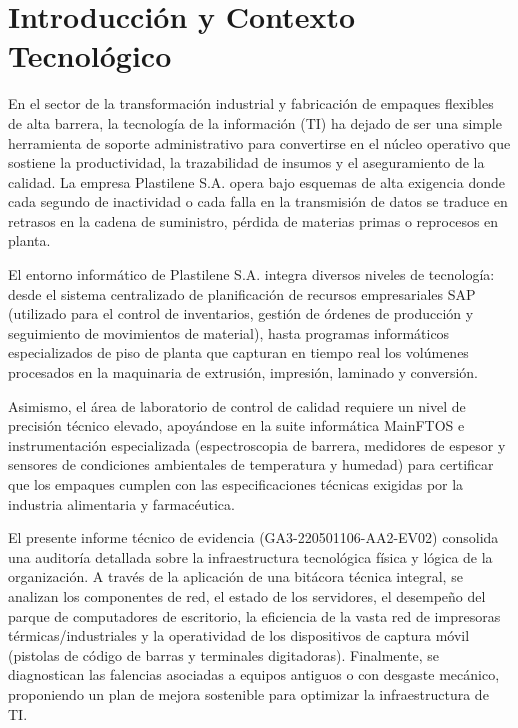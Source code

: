 


	
	
	\newpage
	\tableofcontents
	\newpage
	\doublespacing
	
	\section{Introducción y Contexto Tecnológico}
		En el sector de la transformación industrial y fabricación de empaques flexibles de alta barrera, la tecnología de la información (TI) ha dejado de ser una simple herramienta de soporte administrativo para convertirse en el núcleo operativo que sostiene la productividad, la trazabilidad de insumos y el aseguramiento de la calidad. La empresa Plastilene S.A. opera bajo esquemas de alta exigencia donde cada segundo de inactividad o cada falla en la transmisión de datos se traduce en retrasos en la cadena de suministro, pérdida de materias primas o reprocesos en planta.
		
		El entorno informático de Plastilene S.A. integra diversos niveles de tecnología: desde el sistema centralizado de planificación de recursos empresariales SAP (utilizado para el control de inventarios, gestión de órdenes de producción y seguimiento de movimientos de material), hasta programas informáticos especializados de piso de planta que capturan en tiempo real los volúmenes procesados en la maquinaria de extrusión, impresión, laminado y conversión.
		
		Asimismo, el área de laboratorio de control de calidad requiere un nivel de precisión técnico elevado, apoyándose en la suite informática MainFTOS e instrumentación especializada (espectroscopia de barrera, medidores de espesor y sensores de condiciones ambientales de temperatura y humedad) para certificar que los empaques cumplen con las especificaciones técnicas exigidas por la industria alimentaria y farmacéutica.
		
		El presente informe técnico de evidencia (GA3-220501106-AA2-EV02) consolida una auditoría detallada sobre la infraestructura tecnológica física y lógica de la organización. A través de la aplicación de una bitácora técnica integral, se analizan los componentes de red, el estado de los servidores, el desempeño del parque de computadores de escritorio, la eficiencia de la vasta red de impresoras térmicas/industriales y la operatividad de los dispositivos de captura móvil (pistolas de código de barras y terminales digitadoras). Finalmente, se diagnostican las falencias asociadas a equipos antiguos o con desgaste mecánico, proponiendo un plan de mejora sostenible para optimizar la infraestructura de TI.
		
